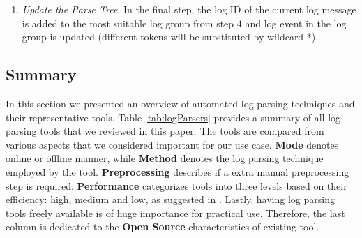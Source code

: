 \begin{enumerate}
        \item \textit{Update the Parse Tree}. In the final step, the log ID of the current log message is added to the most suitable log group from step $4$ and log event in the log group is updated (different tokens will be substituted by wildcard *). 
    \end{enumerate}

    \subsection{Summary} \label{parser_summary}
    In this section we presented an overview of automated log parsing techniques and their representative tools. Table \ref{tab:logParsers} provides a summary of all log parsing tools that we reviewed in this paper. The tools are compared from various aspects that we considered important for our use case. \textbf{Mode} denotes online or offline manner, while \textbf{Method} denotes the log parsing technique employed by the tool. \textbf{Preprocessing} describes if a extra manual preprocessing step is required. \textbf{Performance} categorizes tools into three levels based on their efficiency: high, medium and low, as suggested in \cite{zhlhxzl2018}. Lastly, having log parsing tools freely available is of huge importance for practical use. Therefore, the last column is dedicated to the \textbf{Open Source} characteristics of existing tool. 
    
    \begin{table}[t]
    \centering
    \caption{Summary of automated log parsing tools}
    \label{tab:logParsers}
    \end{table} 
    
